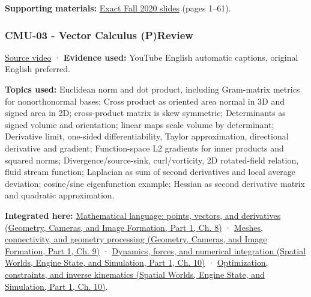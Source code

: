 \textbf{Supporting materials:} \href{https://15462.courses.cs.cmu.edu/fall2020content/lectures/02_linearalgebra/02_linearalgebra_slides.pdf}{Exact Fall 2020 slides} (pages 1--61).

\subsubsection{CMU-03 - Vector Calculus (P)Review}\label{04-visual-computing-ii-ch036-cmu-03---vector-calculus-preview}

\hypertarget{04-visual-computing-ii-ch036-cmu-03---vector-calculus-preview}{}

\href{https://www.youtube.com/watch?v=O7Bec2uX3ZQ}{Source video} · \textbf{Evidence used:} YouTube English automatic captions, original English preferred.

\textbf{Topics used:} Euclidean norm and dot product, including Gram-matrix metrics for nonorthonormal bases; Cross product as oriented area normal in 3D and signed area in 2D; cross-product matrix is skew symmetric; Determinants as signed volume and orientation; linear maps scale volume by determinant; Derivative limit, one-sided differentiability, Taylor approximation, directional derivative and gradient; Function-space L2 gradients for inner products and squared norms; Divergence/source-sink, curl/vorticity, 2D rotated-field relation, fluid stream function; Laplacian as sum of second derivatives and local average deviation; cosine/sine eigenfunction example; Hessian as second derivative matrix and quadratic approximation.

\textbf{Integrated here:} \href{../03-Geometry-Cameras-and-Image-Formation-P01/main.pdf\#03-visual-computing-i-ch001-mathematical-language-points-vectors-and-derivatives}{Mathematical language: points, vectors, and derivatives (Geometry, Cameras, and Image Formation, Part 1, Ch. 8)} · \href{../03-Geometry-Cameras-and-Image-Formation-P01/main.pdf\#03-visual-computing-i-ch002-meshes-connectivity-and-geometry-processing}{Meshes, connectivity, and geometry processing (Geometry, Cameras, and Image Formation, Part 1, Ch. 9)} · \href{../05-Spatial-Worlds-Engine-State-and-Simulation-P01/main.pdf\#04-visual-computing-ii-ch029-dynamics-forces-and-numerical-integration}{Dynamics, forces, and numerical integration (Spatial Worlds, Engine State, and Simulation, Part 1, Ch. 10)} · \href{../05-Spatial-Worlds-Engine-State-and-Simulation-P01/main.pdf\#04-visual-computing-ii-ch029-optimization-constraints-and-inverse-kinematics}{Optimization, constraints, and inverse kinematics (Spatial Worlds, Engine State, and Simulation, Part 1, Ch. 10)}.

